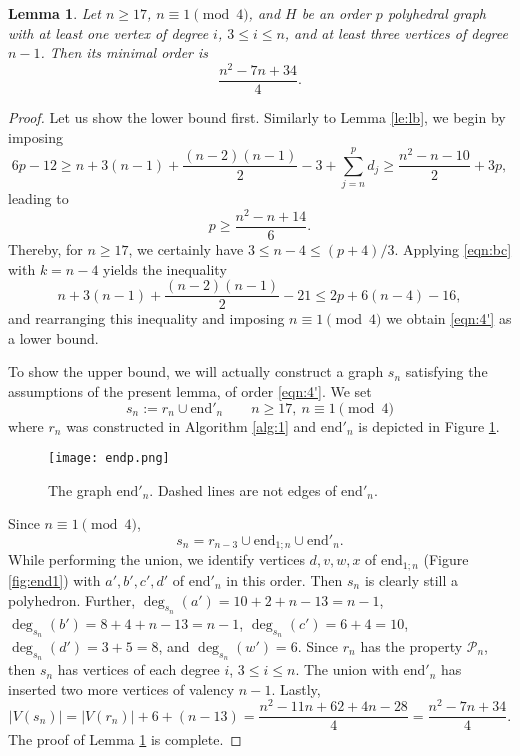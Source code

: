 \documentclass[11pt]{article}
\newtheorem{lemma}[thm]{Lemma}
\theoremstyle{definition}
\numberwithin{equation}{section}
\def\calP{\mathcal{P}}
\begin{document}
\begin{lemma}
	\label{le:ap}
	Let $n\geq 17$, $n\equiv 1\pmod 4$, and $H$ be an order $p$ polyhedral graph with at least one vertex of degree $i$, $3\leq i\leq n$, and at least three vertices of degree $n-1$. Then its minimal order is
	\begin{equation}
	\label{eqn:4'}
	\frac{n^2-7n+34}{4}.
	\end{equation}
\end{lemma}
\begin{proof}
Let us show the lower bound first. Similarly to Lemma \ref{le:lb}, we begin by imposing
\[6p-12\geq n+3(n-1)+\frac{(n-2)(n-1)}{2}-3+\sum_{j=n}^{p}d_j\geq\frac{n^2-n-10}{2}+3p,\]
leading to
\[p\geq\frac{n^2-n+14}{6}.\]
Thereby, for $n\geq 17$, we certainly have $3\leq n-4\leq (p+4)/3$. Applying \eqref{eqn:bc} with $k=n-4$ yields the inequality
\[n+3(n-1)+\frac{(n-2)(n-1)}{2}-21\leq 2p+6(n-4)-16,\]
and rearranging this inequality and imposing $n\equiv 1 \pmod 4$ we obtain \eqref{eqn:4'} as a lower bound.

To show the upper bound, we will actually construct a graph $s_n$ satisfying the assumptions of the present lemma, of order \eqref{eqn:4'}. We set
\begin{equation}
\label{eqn:t}
s_n:=r_{n}\cup\text{end}'_n \qquad n\geq 17, \ n\equiv 1\pmod 4
\end{equation}
where $r_n$ was constructed in Algorithm \ref{alg:1} and $\text{end}'_n$ is depicted in Figure \ref{fig:endp}.

\begin{figure}[h!]
	\centering
	\texttt{[image: endp.png]}
	\caption{The graph $\text{end}'_{n}$. Dashed lines are not edges of $\text{end}'_{n}$.}
	\label{fig:endp}
\end{figure}

Since $n\equiv 1\pmod 4$,
\begin{equation*}
s_n=r_{n-3}\cup\text{end}_{1;n}\cup\text{end}'_n.
\end{equation*}
While performing the union, we identify vertices $d,v,w,x$ of $\text{end}_{1;n}$ (Figure \ref{fig:end1}) with $a',b',c',d'$ of $\text{end}'_n$ in this order. Then $s_n$ is clearly still a polyhedron. Further,
$\deg_{s_n}(a')=10+2+n-13=n-1$,  $\deg_{s_n}(b')=8+4+n-13=n-1$, $\deg_{s_n}(c')=6+4=10$, $\deg_{s_n}(d')=3+5=8$, and $\deg_{s_n}(w')=6$. Since $r_n$ has the property $\calP_n$, then $s_n$ has vertices of each degree $i$, $3\leq i\leq n$. The union with $\text{end}'_n$ has inserted two more vertices of valency $n-1$. Lastly,
\begin{equation}
|V(s_n)|=|V(r_n)|+6+(n-13)=\frac{n^2-11n+62+4n-28}{4}=\frac{n^2-7n+34}{4}.
\end{equation}
The proof of Lemma \ref{le:ap} is complete.
\end{proof}
\end{document}
